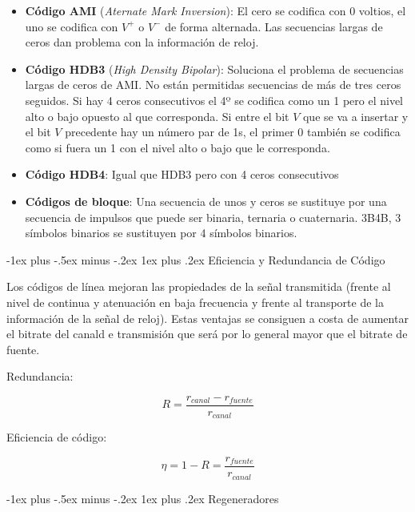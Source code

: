 \documentclass[10pt,portrait, twocolumn]{article}
\makeatletter
\renewcommand{\subsubsection}{\@startsection{subsubsection}{3}{0mm}%
                                {-1ex plus -.5ex minus -.2ex}%
                                {1ex plus .2ex}%
                                {\normalfont\small\bfseries}}
\makeatother
\begin{document}
	\begin{itemize}
		\item \textbf{Código AMI} (\textit{Aternate Mark Inversion}): El cero se codifica con 0 voltios, el uno se codifica con $V^{+}$ o $V^{-}$ de forma alternada. Las secuencias largas de ceros dan problema con la información de reloj.
		\item \textbf{Código HDB3} (\textit{High Density Bipolar}): Soluciona el problema de secuencias largas de ceros de AMI. No están permitidas secuencias de más de tres ceros seguidos. Si hay 4 ceros consecutivos el 4º se codifica como un 1 pero el nivel alto o bajo opuesto al que corresponda. Si entre el bit $V$ que se va a insertar y el bit $V$ precedente hay un número par de 1s, el primer 0 también se codifica como si fuera un 1 con el nivel alto o bajo que le corresponda.
		\item \textbf{Código HDB4}: Igual que HDB3 pero con 4 ceros consecutivos
		\item \textbf{Códigos de bloque}: Una secuencia de unos y ceros se sustituye por una secuencia de impulsos que puede ser binaria, ternaria o cuaternaria. 3B4B, 3 símbolos binarios se sustituyen por 4 símbolos binarios.
	\end{itemize}
	
\subsubsection{Eficiencia y Redundancia de Código}


Los códigos de línea mejoran las propiedades de la señal transmitida (frente al nivel de continua y atenuación en baja frecuencia y frente al transporte de la información de la señal de reloj). Estas ventajas se consiguen a costa de aumentar el bitrate del canald e transmisión que será por lo general mayor que el bitrate de fuente.

Redundancia:

	\begin{equation*}
		R = \frac{r_{canal} - r_{fuente}}{r_{canal}}
	\end{equation*}
	
Eficiencia de código:

	\begin{equation*}
		\eta = 1 - R = \frac{r_{fuente}}{r_{canal}}
	\end{equation*}
	
\subsubsection{Regeneradores}
\end{document}
